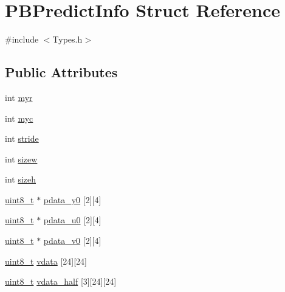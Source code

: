 \hypertarget{struct_p_b_predict_info}{
\section{PBPredictInfo Struct Reference}
\label{struct_p_b_predict_info}
}


{\ttfamily \#include $<$Types.h$>$}

\subsection*{Public Attributes}
\begin{DoxyCompactItemize}
\item 
int \hyperlink{struct_p_b_predict_info_a1eda4a8837300bed803d81ada5dfbb30}{myr}
\item 
int \hyperlink{struct_p_b_predict_info_ac46c76693de4dab4a105494d1220dc0a}{myc}
\item 
int \hyperlink{struct_p_b_predict_info_a96c9413deeef7bfcd16237bfef11c8ae}{stride}
\item 
int \hyperlink{struct_p_b_predict_info_a26162322380d1afd96ee0c894f6ee08e}{sizew}
\item 
int \hyperlink{struct_p_b_predict_info_a22f7b2cc9619bf678980e45fc9ef7f1b}{sizeh}
\item 
\hyperlink{_types_8h_a363e4d606232036a6b89060813c45489}{uint8\_\-t} $\ast$ \hyperlink{struct_p_b_predict_info_a7c7d2c72aa539c0e2365b4e04e18a0ca}{pdata\_\-y0} \mbox{[}2\mbox{]}\mbox{[}4\mbox{]}
\item 
\hyperlink{_types_8h_a363e4d606232036a6b89060813c45489}{uint8\_\-t} $\ast$ \hyperlink{struct_p_b_predict_info_aaf07e44714249f4131c030df88bf8169}{pdata\_\-u0} \mbox{[}2\mbox{]}\mbox{[}4\mbox{]}
\item 
\hyperlink{_types_8h_a363e4d606232036a6b89060813c45489}{uint8\_\-t} $\ast$ \hyperlink{struct_p_b_predict_info_a8dc8f424bcb4274ef583207aa9827962}{pdata\_\-v0} \mbox{[}2\mbox{]}\mbox{[}4\mbox{]}
\item 
\hyperlink{_types_8h_a363e4d606232036a6b89060813c45489}{uint8\_\-t} \hyperlink{struct_p_b_predict_info_aaa7f5b9d6def9506a306d9e5fdf0c7f4}{vdata} \mbox{[}24\mbox{]}\mbox{[}24\mbox{]}
\item 
\hyperlink{_types_8h_a363e4d606232036a6b89060813c45489}{uint8\_\-t} \hyperlink{struct_p_b_predict_info_ae10de4e25fedb10d0ea1dbaf3b34c4ac}{vdata\_\-half} \mbox{[}3\mbox{]}\mbox{[}24\mbox{]}\mbox{[}24\mbox{]}
\end{DoxyCompactItemize}


